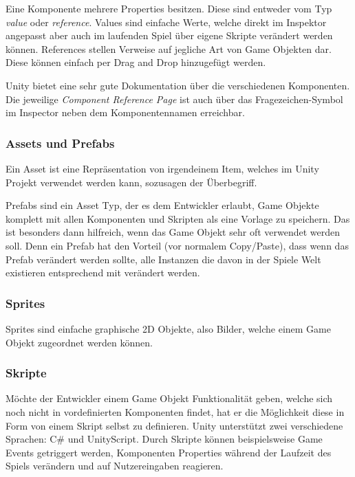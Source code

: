 Eine Komponente mehrere Properties besitzen. Diese sind entweder vom Typ \textit{value} oder \textit{reference}. Values sind einfache Werte, welche direkt im Inspektor angepasst aber auch im laufenden Spiel über eigene Skripte verändert werden können. References stellen Verweise auf jegliche Art von Game Objekten dar. Diese können einfach per Drag and Drop hinzugefügt werden.

Unity bietet eine sehr gute Dokumentation über die verschiedenen Komponenten. Die jeweilige \textit{Component Reference Page} ist auch über das Fragezeichen-Symbol im Inspector neben dem Komponentennamen erreichbar. \cite{F_6.3.2.3_Komponenten}

\subsubsection{Assets und Prefabs}
Ein Asset ist eine Repräsentation von irgendeinem Item, welches im Unity Projekt verwendet werden kann, sozusagen der Überbegriff.

Prefabs sind ein Asset Typ, der es dem Entwickler erlaubt, Game Objekte komplett mit allen Komponenten und Skripten als eine \glqq Vorlage \grqq zu speichern. Das ist besonders dann hilfreich, wenn das Game Objekt sehr oft verwendet werden soll. Denn ein Prefab hat den Vorteil (vor normalem Copy/Paste), dass wenn das Prefab verändert werden sollte, alle Instanzen die davon in der Spiele Welt existieren entsprechend mit verändert werden. ~\cite{F_6.3.2.4_Prefabs} 

\subsubsection{Sprites}

Sprites sind einfache graphische 2D Objekte, also Bilder, welche einem Game Objekt zugeordnet werden können. ~\cite{F_6.3.2.5_Sprites}

\subsubsection{Skripte}
Möchte der Entwickler einem Game Objekt Funktionalität geben, welche sich noch nicht in vordefinierten Komponenten findet, hat er die Möglichkeit diese in Form von einem Skript selbst zu definieren. Unity unterstützt zwei verschiedene Sprachen: C\# und UnityScript. Durch Skripte können beispielsweise Game Events getriggert werden, Komponenten Properties während der Laufzeit des Spiels verändern und auf Nutzereingaben reagieren. ~\cite{F_6.3.2.6_Skripte}


